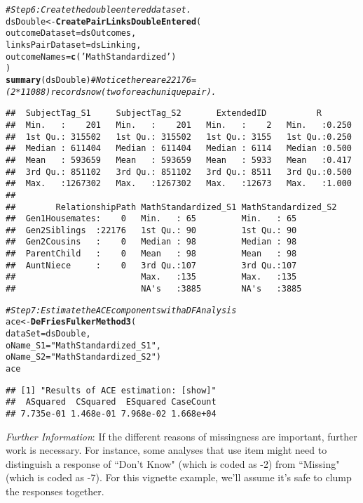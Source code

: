 \documentclass{article}\usepackage[]{graphicx}\usepackage[]{color}
\makeatletter
\newcommand{\hlstr}[1]{\textcolor[rgb]{0.192,0.494,0.8}{#1}}%
\newcommand{\hlcom}[1]{\textcolor[rgb]{0.678,0.584,0.686}{\textit{#1}}}%
\newcommand{\hlstd}[1]{\textcolor[rgb]{0.345,0.345,0.345}{#1}}%
\newcommand{\hlkwb}[1]{\textcolor[rgb]{0.69,0.353,0.396}{#1}}%
\newcommand{\hlkwc}[1]{\textcolor[rgb]{0.333,0.667,0.333}{#1}}%
\newcommand{\hlkwd}[1]{\textcolor[rgb]{0.737,0.353,0.396}{\textbf{#1}}}%
\newenvironment{kframe}{%
 \def\at@end@of@kframe{}%
 \ifinner\ifhmode%
  \def\at@end@of@kframe{\end{minipage}}%
  \begin{minipage}{\columnwidth}%
 \fi\fi%
 \def\FrameCommand##1{\hskip\@totalleftmargin \hskip-\fboxsep
 \colorbox{shadecolor}{##1}\hskip-\fboxsep
     \hskip-\linewidth \hskip-\@totalleftmargin \hskip\columnwidth}%
 \MakeFramed {\advance\hsize-\width
   \@totalleftmargin\z@ \linewidth\hsize
   \@setminipage}}%
 {\par\unskip\endMakeFramed%
 \at@end@of@kframe}
\newenvironment{knitrout}{}{} %
\makeatother
\begin{document}
\begin{knitrout}
\begin{kframe}
\begin{alltt}
\hlcom{#Step 6: Create the double entered dataset.}
\hlstd{dsDouble} \hlkwb{<-} \hlkwd{CreatePairLinksDoubleEntered}\hlstd{(}
  \hlkwc{outcomeDataset}   \hlstd{= dsOutcomes,}
  \hlkwc{linksPairDataset} \hlstd{= dsLinking,}
  \hlkwc{outcomeNames}     \hlstd{=} \hlkwd{c}\hlstd{(}\hlstr{'MathStandardized'}\hlstd{)}
\hlstd{)}
\hlkwd{summary}\hlstd{(dsDouble)} \hlcom{#Notice there are 22176=(2*11088) records now (two for each unique pair).}
\end{alltt}
\begin{verbatim}
##  SubjectTag_S1     SubjectTag_S2       ExtendedID          R        
##  Min.   :    201   Min.   :    201   Min.   :    2   Min.   :0.250  
##  1st Qu.: 315502   1st Qu.: 315502   1st Qu.: 3155   1st Qu.:0.250  
##  Median : 611404   Median : 611404   Median : 6114   Median :0.500  
##  Mean   : 593659   Mean   : 593659   Mean   : 5933   Mean   :0.417  
##  3rd Qu.: 851102   3rd Qu.: 851102   3rd Qu.: 8511   3rd Qu.:0.500  
##  Max.   :1267302   Max.   :1267302   Max.   :12673   Max.   :1.000  
##                                                                     
##        RelationshipPath MathStandardized_S1 MathStandardized_S2
##  Gen1Housemates:    0   Min.   : 65         Min.   : 65        
##  Gen2Siblings  :22176   1st Qu.: 90         1st Qu.: 90        
##  Gen2Cousins   :    0   Median : 98         Median : 98        
##  ParentChild   :    0   Mean   : 98         Mean   : 98        
##  AuntNiece     :    0   3rd Qu.:107         3rd Qu.:107        
##                         Max.   :135         Max.   :135        
##                         NA's   :3885        NA's   :3885
\end{verbatim}
\begin{alltt}
\hlcom{#Step 7: Estimate the ACE components with a DF Analysis }
\hlstd{ace} \hlkwb{<-} \hlkwd{DeFriesFulkerMethod3}\hlstd{(}
    \hlkwc{dataSet}  \hlstd{= dsDouble,}
    \hlkwc{oName_S1} \hlstd{=} \hlstr{"MathStandardized_S1"}\hlstd{,}
    \hlkwc{oName_S2} \hlstd{=} \hlstr{"MathStandardized_S2"}\hlstd{)}
\hlstd{ace}
\end{alltt}
\begin{verbatim}
## [1] "Results of ACE estimation: [show]"
##  ASquared  CSquared  ESquared CaseCount 
## 7.735e-01 1.468e-01 7.968e-02 1.668e+04
\end{verbatim}
\end{kframe}
\end{knitrout}


\emph{Further Information}: If the different reasons of missingness are important, further work is necessary.  For instance, some analyses that use item  might need to distinguish a response of ``Don't Know" (which is coded as -2) from ``Missing" (which is coded as -7).  For this vignette example, we'll assume it's safe to clump the responses together.
\end{document}
